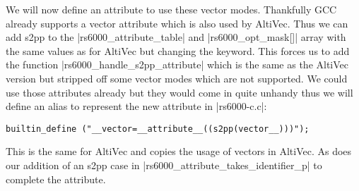 We will now define an attribute to use these vector modes.
Thankfully GCC already supports a vector attribute which is also used by AltiVec.
Thus we can add s2pp to the |rs6000_attribute_table| and |rs6000_opt_mask[]| array with the same values as for AltiVec but changing the keyword.
This forces us to add the function |rs6000_handle_s2pp_attribute| which is the same as the AltiVec version but stripped off some vector modes which are not supported.
We could use those attributes already but they would come in quite unhandy thus we will define an alias to represent the new attribute in |rs6000-c.c|:
\begin{lstlisting}
builtin_define ("__vector=__attribute__((s2pp(vector__)))");
\end{lstlisting}
This is the same for AltiVec and copies the usage of vectors in AltiVec.
As does our addition of an s2pp case in |rs6000_attribute_takes_identifier_p| to complete the attribute.

